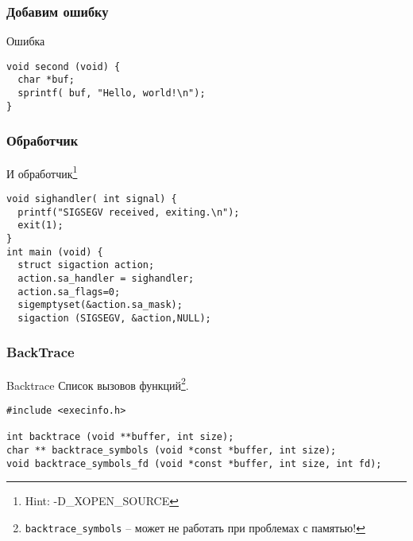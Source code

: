 %
%
%
%

\begin{frame}[fragile]
	\frametitle{Добавим ошибку}

	\begin{block}{Ошибка}
	
	\begin{lstlisting}
void second (void) {
  char *buf;
  sprintf( buf, "Hello, world!\n");
}
	\end{lstlisting}
	\end{block}
	
\end{frame}
\begin{frame}[fragile]
  \frametitle{Обработчик}
	\begin{block}{И обработчик}\footnote{Hint: -D\_XOPEN\_SOURCE}
	\begin{lstlisting}
void sighandler( int signal) {
  printf("SIGSEGV received, exiting.\n");
  exit(1);
}
int main (void) {
  struct sigaction action;
  action.sa_handler = sighandler;
  action.sa_flags=0;
  sigemptyset(&action.sa_mask);
  sigaction (SIGSEGV, &action,NULL);
	\end{lstlisting}
	\end{block}

\end{frame}



\begin{frame}[fragile]
	\frametitle{BackTrace}

	\begin{block}{Backtrace}
		Список вызовов функций\footnote{{\tt backtrace\_symbols} -- может не работать при проблемах с памятью!}.

	\end{block}

	\begin{lstlisting}
#include <execinfo.h>

int backtrace (void **buffer, int size);
char ** backtrace_symbols (void *const *buffer, int size);
void backtrace_symbols_fd (void *const *buffer, int size, int fd);
	\end{lstlisting}
\end{frame}

